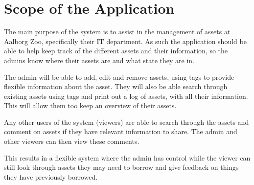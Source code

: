 \section{Scope of the Application}\label{sc:scope}
The main purpose of the system is to assist in the management of assets at Aalborg Zoo, specifically their IT department. As such the application should be able to help keep track of the different assets and their information, so the admins know where their assets are and what state they are in. 
\par
The admin will be able to add, edit and remove assets, using tags to provide flexible information about the asset. They will also be able search through existing assets using tags and print out a log of assets, with all their information. This will allow them too keep an overview of their assets. 
\par
Any other users of the system (viewers) are able to search through the assets and comment on assets if they have relevant information to share. The admin and other viewers can then view these comments. 
\par
This results in a flexible system where the admin has control while the viewer can still look through assets they may need to borrow and give feedback on things they have previously borrowed. 